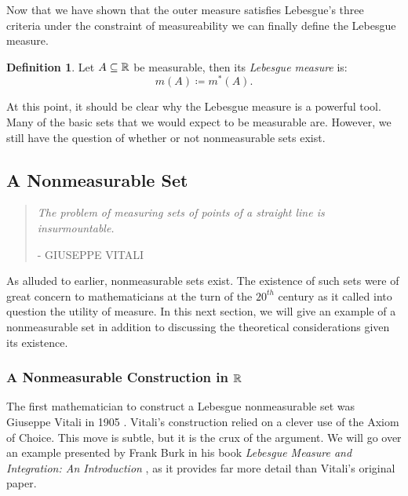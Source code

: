 \documentclass{article}
\theoremstyle{axiom} \newtheorem{axiom}{Axiom}
\theoremstyle{definition} \newtheorem{definition}{Definition}
\theoremstyle{example} \newtheorem{example}{Example}
\theoremstyle{proposition} \newtheorem{prop}{Proposition}
\theoremstyle{lemma} \newtheorem{lemma}{Lemma}
\begin{document}
Now that we have shown that the outer measure satisfies Lebesgue's
three criteria under the constraint of measureability we can finally define 
the Lebesgue  measure.
\begin{definition}
	Let $A\subseteq \mathbb{R}$ be measurable, then its \textit{Lebesgue measure} is:
	\begin{equation}
		m(A) \coloneqq m^*(A).
	\end{equation}
\end{definition}
At this point, it should be clear why the Lebesgue measure is a powerful tool.
Many of the basic sets that we would expect to be measurable are. However, we 
still have the question of whether or not nonmeasurable sets exist. 

\subsection{A Nonmeasurable Set}
\begin{quote}
	\textit{The problem of measuring sets of points of a straight line is
	insurmountable.}

	\uppercase{\tiny{- Giuseppe Vitali}}	
\end{quote}

As alluded to earlier, nonmeasurable sets exist. The existence of
such sets were of great concern to mathematicians at the turn of the $20^{th}$ century
as it called into question the utility of measure. In this next section, we will
give an example of a nonmeasurable set in addition to discussing the theoretical
considerations given its existence.

\subsubsection{A Nonmeasurable Construction in $\mathbb{R}$}

The first mathematician to construct a Lebesgue nonmeasurable set was Giuseppe 
Vitali in 1905 \cite{vitali:1905}. Vitali's construction relied on a clever use 
of the Axiom of Choice.  This move is subtle, but it is the crux of the argument. 
We will go over an example presented by Frank Burk in his book 
\textit{Lebesgue Measure and Integration: An Introduction} \cite{burk:1998},
as it provides far more detail than Vitali's original paper.
\end{document}
